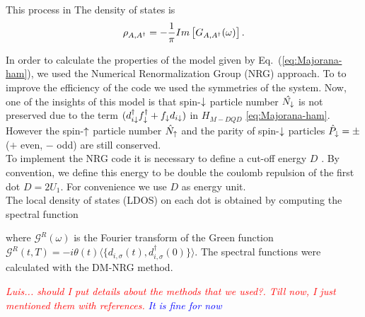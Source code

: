 \documentclass[showpacs,aps,prb,reprint,superscriptaddress]{revtex4-1}
\newcommand{\LUIS}[1]{\textcolor{blue}{\fbox{Luis} {\sl#1}}}
\newcommand{\Jesus}[1]{\textcolor{red}{\fbox{Jesus} {\sl#1}}}
\begin{document}
This process in 
The density of states is 
\begin{equation}
    \rho_{A,A^\dagger}=-\frac{1}{\pi}Im\left[G_{A,A^\dagger}(\omega)\right].
    \label{eq:Density of States}
\end{equation}





In order to calculate the properties of the model given by Eq.\ (\ref{eq:Majorana-ham}), we used the Numerical Renormalization Group (NRG) approach. \cite{wilson_renormalization_1975,sindel_numerical_2005,bulla_numerical_2008} 
 To to improve the efficiency of the code we used the symmetries of the system.  Now, one of the insights of this model is that spin-$\downarrow$ particle number $\hat{N_\downarrow}$ is not preserved due to the term $(d_{i\downarrow}^{\dagger}f^\dagger_{\downarrow} + 
f_{\downarrow}d_{i\downarrow})$ in $H_{M-DQD}$ \eqref{eq:Majorana-ham}. However the  spin-$\uparrow$ particle number $\hat{N}_\uparrow$ and the parity of spin-$\downarrow$ particles $\hat{P}_\downarrow = \pm $ ($+$ even, $-$ odd) are still conserved. \\

To implement the NRG code it is necessary to define a cut-off energy $D$ \cite{bulla_numerical_2008}. By convention, we define this energy to be double the coulomb repulsion of the first dot $D = 2U_1$. For convenience we use $D$ as energy unit.  \\



The local density of states (LDOS) on each dot is obtained by computing the spectral function 


%
where $\mathcal{G}^R(\omega)$ is the Fourier transform of the Green function $\mathcal{G}^R(t,T)=-i\theta(t) \langle \{d_{i,\sigma}(t) , d_{i,\sigma}^\dagger(0)\} \rangle$. The spectral functions were calculated with the DM-NRG method.\cite{hofstetter_generalized_2000} 



\Jesus{Luis... should I put details about the methods that we used?. Till now, I just mentioned them with references. }
\LUIS{It is fine for now}
\end{document}
